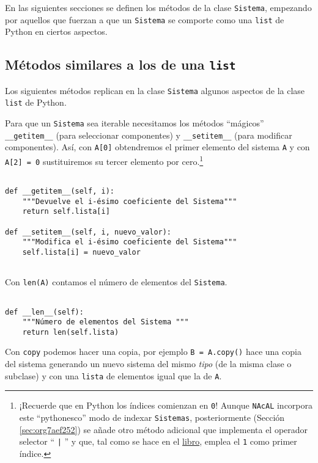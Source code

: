 \documentclass[11pt]{report}
\begin{document}
En las siguientes secciones se definen los métodos de la clase \texttt{Sistema}, empezando por aquellos que
fuerzan a que un \texttt{Sistema} se comporte como una \texttt{list} de Python en ciertos aspectos.

\medskip

\subsection{Métodos similares a los de una \texttt{list}}
\label{sec:org0171e4f}
Los siguientes métodos replican en la clase \texttt{Sistema} algunos aspectos de la clase \texttt{list} de Python.

Para que un \texttt{Sistema} sea iterable necesitamos los métodos ``mágicos'' \texttt{\_\_getitem\_\_} (para
seleccionar componentes) y \texttt{\_\_setitem\_\_} (para modificar componentes).  Así, con \texttt{A[0]} obtendremos
el primer elemento del sistema \texttt{A} y con \texttt{A[2] = 0} sustituiremos su tercer elemento por cero.\footnote{¡Recuerde que en Python los índices comienzan en \texttt{0}!  Aunque \texttt{NAcAL} incorpora este ``pythonesco''
modo de indexar \texttt{Sistemas}, posteriormente (Sección \ref{sec:org7aef252}) se añade otro método adicional que implementa el operador selector
`` \texttt{|} '' y que, tal como se hace en el \href{https://mbujosab.github.io/CursoDeAlgebraLineal/libro.pdf\#chapter.1}{libro}, emplea el \texttt{1} como primer índice.}


\begin{verbatim}

def __getitem__(self, i):
    """Devuelve el i-ésimo coeficiente del Sistema"""
    return self.lista[i]

def __setitem__(self, i, nuevo_valor):
    """Modifica el i-ésimo coeficiente del Sistema"""
    self.lista[i] = nuevo_valor
        
\end{verbatim}

Con \texttt{len(A)} contamos el número de elementos del \texttt{Sistema}. 


\begin{verbatim}

def __len__(self):
    """Número de elementos del Sistema """
    return len(self.lista)

\end{verbatim}

Con \texttt{copy} podemos hacer una copia, por ejemplo \texttt{B = A.copy()} hace una copia del sistema 
generando un nuevo sistema del mismo \emph{tipo} (de la misma clase o subclase) y con una \texttt{lista} de
elementos igual que la de \texttt{A}.
\end{document}
